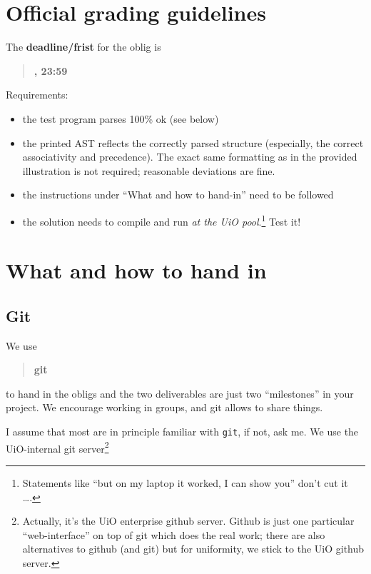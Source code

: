 \documentclass[10pt,freeform]{handout}[2014/08/13]
\begin{document}
\thispagestyle{empty}

\section{Official grading guidelines}
\label{sec:official-info}




\hrulefill{}

The \textbf{deadline/frist}  for the oblig is

\begin{quote}
  \textbf{\deadlineone, 23:59}
\end{quote}

Requirements:


\begin{itemize}
\item the test program parses 100\% ok (see below)
\item the printed AST reflects the correctly parsed structure (especially,
  the correct associativity and precedence). The exact same formatting as
  in the provided illustration is not required; reasonable deviations are
  fine.
\item the instructions under ``What and how to  hand-in'' need to be followed
\item the solution needs to compile and run \emph{at the UiO
    pool}.\footnote{Statements like ``but on my laptop it worked, I can show
    you'' don't cut it \ldots.} Test it!
\end{itemize}

\hrulefill




\section{What and how to hand in}
\label{sec:what-how}


\subsection{Git}
\label{sec:git}



We use
\begin{quote}
  \textbf{git}   
\end{quote}
to hand in the obligs and the two deliverables are just two ``milestones''
in your project. We encourage working in groups, and git allows to share
things.

I assume that most are in principle familiar with \texttt{git}, if not, ask
me.  We use the UiO-internal git server\footnote{Actually, it's the UiO
  enterprise github server. Github is just one particular ``web-interface''
  on top of git which does the real work; there are also alternatives to
  github (and git) but for uniformity, we stick to the UiO github server.}
\end{document}
